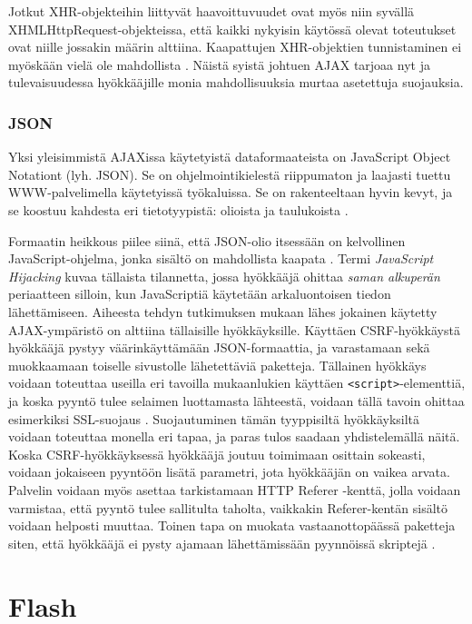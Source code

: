 Jotkut XHR-objekteihin liittyvät haavoittuvuudet ovat myös niin
syvällä XHMLHttpRequest-objekteissa, että kaikki nykyisin käytössä
olevat toteutukset ovat niille jossakin määrin alttiina. Kaapattujen
XHR-objektien tunnistaminen ei myöskään vielä ole mahdollista
\cite{AJAX}. Näistä syistä johtuen AJAX tarjoaa nyt ja tulevaisuudessa
hyökkääjille monia mahdollisuuksia murtaa asetettuja suojauksia.

\subsubsection{JSON}

Yksi yleisimmistä AJAXissa käytetyistä dataformaateista on JavaScript
Object Notationt (lyh. JSON). Se on ohjelmointikielestä riippumaton ja
laajasti tuettu WWW-palvelimella käytetyissä työkaluissa. Se on
rakenteeltaan hyvin kevyt, ja se koostuu kahdesta eri tietotyypistä:
olioista ja taulukoista \cite{JSON}.

Formaatin heikkous piilee siinä, että JSON-olio itsessään on
kelvollinen JavaScript-ohjelma, jonka sisältö on mahdollista kaapata
\cite{AJAX}. Termi \emph{JavaScript Hijacking} kuvaa tällaista
tilannetta, jossa hyökkääjä ohittaa \emph{saman alkuperän} periaatteen
silloin, kun JavaScriptiä käytetään arkaluontoisen tiedon
lähettämiseen. Aiheesta tehdyn tutkimuksen \cite{JSH} mukaan lähes
jokainen käytetty AJAX-ympäristö on alttiina tällaisille
hyökkäyksille. Käyttäen CSRF-hyökkäystä hyökkääjä pystyy
väärinkäyttämään JSON-for\-maat\-ti\-a, ja varastamaan sekä muokkaamaan
toiselle sivustolle lähetettäviä paketteja.  Tällainen hyökkäys
voidaan toteuttaa useilla eri tavoilla mukaanlukien käyttäen
\texttt{<script>}-elementtiä, ja koska pyyntö tulee selaimen luottamasta
lähteestä, voidaan tällä tavoin ohittaa esimerkiksi SSL-suojaus
\cite{AJAX}. Suojautuminen tämän tyyppisiltä hyökkäyksiltä voidaan
toteuttaa monella eri tapaa, ja paras tulos saadaan yhdistelemällä
näitä. Koska CSRF-hyök\-käyk\-ses\-sä hyökkääjä joutuu toimimaan osittain
sokeasti, voidaan jokaiseen pyyntöön lisätä parametri, jota hyökkääjän
on vaikea arvata. Palvelin voidaan myös asettaa tarkistamaan HTTP
Referer -kenttä, jolla voidaan varmistaa, että pyyntö tulee sallitulta
taholta, vaikkakin Referer-kentän sisältö voidaan helposti
muuttaa. Toinen tapa on muokata vastaanottopäässä paketteja siten,
että hyökkääjä ei pysty ajamaan lähettämissään pyynnöissä skriptejä
\cite{JSH}.

\section{Flash}

